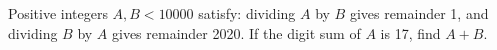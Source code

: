 Positive integers $A,B<10000$ satisfy: dividing $A$ by $B$ gives remainder 1, and dividing $B$ by $A$ gives remainder 2020. If the digit sum of $A$ is 17, find $A+B$.
